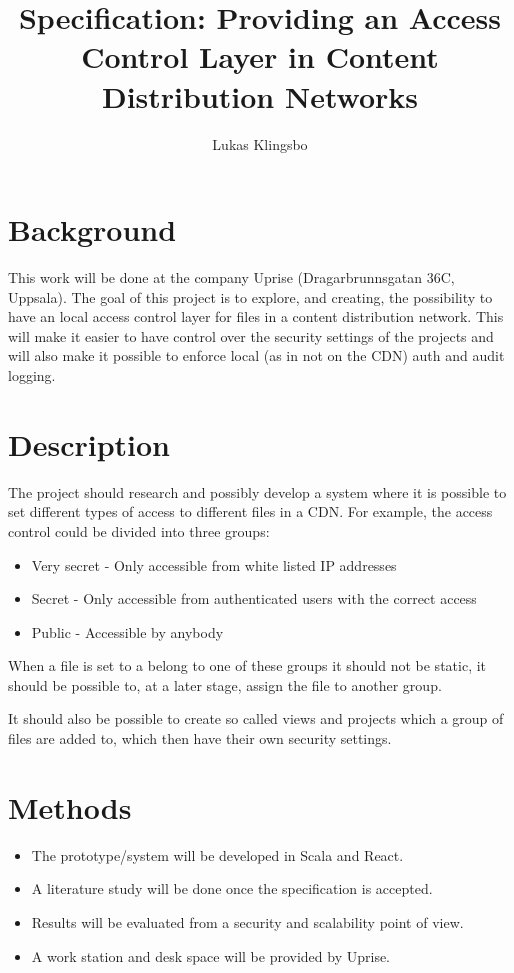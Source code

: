 \documentclass[a4paper,12pt]{article}
\title{\textbf{Specification: Providing an Access Control Layer in Content Distribution Networks}}
\author{Lukas Klingsbo}
\begin{document}
\maketitle

\setcounter{tocdepth}{3}
\tableofcontents

\clearpage
{}
\setcounter{page}{1}
\section{Background}
This work will be done at the company Uprise (Dragarbrunnsgatan 36C, Uppsala). 
The goal of this project is to explore, and creating, the possibility to have 
an local access control layer for files in a content distribution network.
This will make it easier to have control over the security settings of the 
projects and will also make it possible to enforce local (as in not on the CDN) 
auth and audit logging.

\section{Description}
The project should research and possibly develop a system where it is possible 
to set different types of access to different files in a CDN. 
For example, the access control could be divided into three groups:
\begin{itemize}
  \item Very secret - Only accessible from white listed IP addresses
  \item Secret - Only accessible from authenticated users with the correct access
  \item Public - Accessible by anybody
\end{itemize}

When a file is set to a belong to one of these groups it should not be static, 
it should be possible to, at a later stage, assign the file to another group.

It should also be possible to create so called views and projects which a group 
of files are added to, which then have their own security settings.

\section{Methods}
\begin{itemize}
  \item The prototype/system will be developed in Scala and React. 
  \item A literature study will be done once the specification is accepted. 
  \item Results will be evaluated from a security and scalability point of view. 
  \item A work station and desk space will be provided by Uprise.
\end{itemize}
\end{document}
